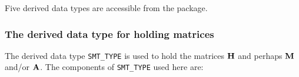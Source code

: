\documentclass{galahad}
\begin{document}








\galtypes
Five derived data types are accessible from the package.


\subsubsection{The derived data type for holding matrices}\label{typesmt}
The derived data type {\tt SMT\_TYPE} is used to hold the matrices ${\mathbf{H}}$
and perhaps ${\mathbf{M}}$ and/or ${\mathbf{A}}$.
The components of {\tt SMT\_TYPE} used here are:
\end{document}
